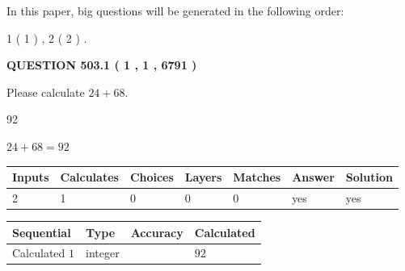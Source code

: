 \documentclass[12pt]{article}
\begin{document}
In this paper, big questions will be generated in the following order: 
   
   
   1 ( 1 )
 ,
   2 ( 2 )
 .
  
\vspace{0.2in}
  
{\textbf{\Large{QUESTION
503.1 
 ( 1 , 1 , 6791 )
}}}
  
  
 
Please calculate $ %
24 +  %
68 $.
 
 
 
\noindent{}
 
 

92
 
 
\noindent{}
 
 

 
 
 
\noindent{}
 
 

$ %
24 +  %
68=   %
92$
 
 
\noindent{}
 
 

 
   
   
   
   
\noindent\begin{tabular}{|l|l|l|l|l|l|l|}
 \hline
Inputs & Calculates & Choices & Layers & Matches & Answer & Solution \\ \hline
 2  & 
 1  & 
 0
  & 
 0  & 
 0  & 
  yes & 
  yes 
  \\ \hline
 \end{tabular}
   
   
   
   
\noindent{}
   
   
  
  
\noindent\begin{tabular}{|l|l|l|l|}
\hline
 Sequential & Type & Accuracy & Calculated \\ 
\hline
 
 
  Calculated $  1 $ & integer &  & 
  $ 92 $ 
 \\  \hline  
 \end{tabular}
   
\end{document}
